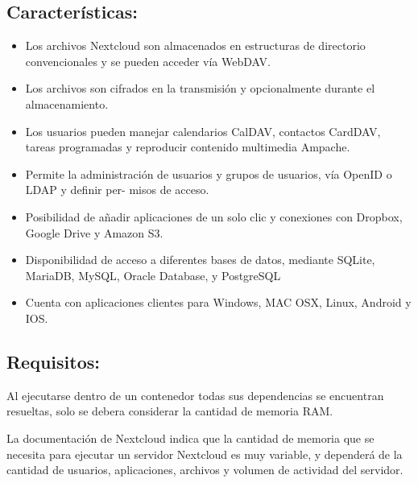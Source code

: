 	
			\subsection{Características:}
		
				\begin{itemize}
					
					\item Los archivos Nextcloud son almacenados en estructuras de directorio convencionales y se
					pueden acceder vía WebDAV.
					
					\item Los archivos son cifrados en la transmisión y opcionalmente durante el almacenamiento.
					
					\item Los usuarios pueden manejar calendarios CalDAV, contactos CardDAV, tareas programadas y
					reproducir contenido multimedia Ampache.
					
					\item Permite la administración de usuarios y grupos de usuarios, vía OpenID o LDAP y definir per-
					misos de acceso.
					
					\item Posibilidad de añadir aplicaciones de un solo clic y conexiones con Dropbox, Google Drive y
					Amazon S3.
					
					\item Disponibilidad de acceso a diferentes bases de datos, mediante SQLite, MariaDB, MySQL,
					Oracle Database, y PostgreSQL
					
					\item Cuenta con aplicaciones clientes para Windows, MAC OSX, Linux, Android y IOS.\par
					
					
				\end{itemize}

			\subsection{Requisitos:}
		
				
				Al ejecutarse dentro de un contenedor todas sus dependencias se encuentran resueltas, solo se debera considerar la cantidad de memoria RAM.\par
					
				La documentación de Nextcloud indica que la cantidad de memoria que se necesita para ejecutar un servidor Nextcloud es muy variable, y dependerá de la cantidad de usuarios, aplicaciones, archivos y volumen de actividad del servidor.\par
			
